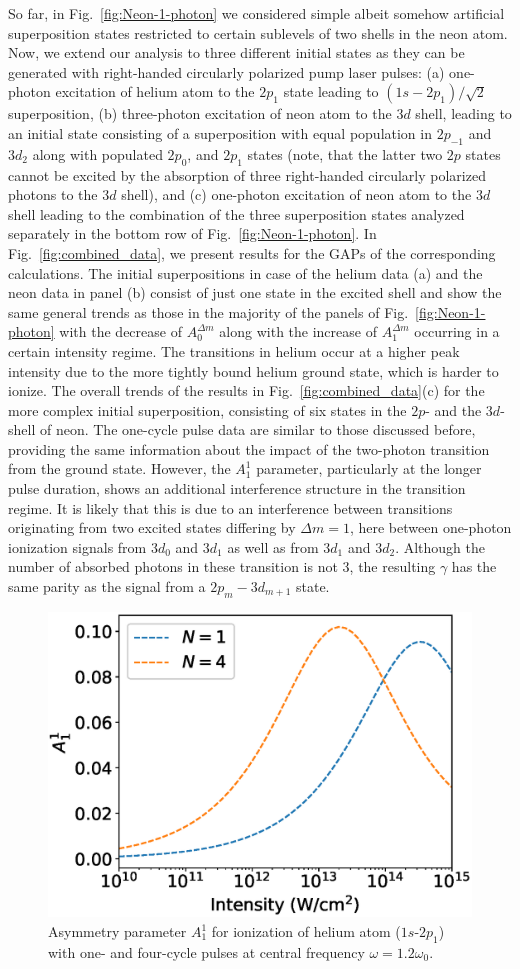 So far, in Fig.~\ref{fig:Neon-1-photon} we considered simple albeit somehow artificial superposition states restricted to certain sublevels of two shells in the neon atom. Now, we extend our analysis to three different initial states as they can be generated with right-handed circularly polarized pump laser pulses: (a) one-photon excitation of helium atom to the $2p_1$ state leading to $(1s-2p_1)/\sqrt{2}$ superposition, (b) three-photon excitation of neon atom to the $3d$  shell, leading to an initial state consisting of a superposition with equal population in $2p_{-1}$ and $3d_2$ along with populated $2p_0$, and $2p_1$ states (note, that the latter two $2p$ states cannot be excited by the absorption of three right-handed circularly polarized photons to the $3d$ shell), and (c) one-photon excitation of neon atom to the $3d$ shell leading to the combination of the three superposition states analyzed separately in the bottom row of Fig.~\ref{fig:Neon-1-photon}.
In Fig.~\ref{fig:combined_data}, we present results for the GAPs of the corresponding calculations.
The initial superpositions in case of the helium data (a) and the neon data in panel (b) consist of just one state in the excited shell and show the same general trends as those in the majority of the panels of  Fig.~\ref{fig:Neon-1-photon} with the decrease of $A_0^{\Delta m}$ along with the increase of $A_1^{\Delta m}$ occurring in a certain  intensity regime. The transitions in helium occur at a higher peak intensity due to the more tightly bound helium ground state, which is harder to ionize.  
The overall trends of the results in Fig.~\ref{fig:combined_data}(c) for the more complex initial superposition, consisting of six states in the $2p$- and the $3d$-shell of neon.
The one-cycle pulse data are similar to those discussed before, providing the same information about the impact of the two-photon transition from the ground state. However, the $A_1^1$ parameter, particularly at the longer pulse duration, shows an additional interference structure in the transition regime. It is likely that this is due
to an interference between transitions originating from two excited states differing by $\Delta m = 1$, here between one-photon ionization signals
from $3d_0$ and $3d_1$ as well as from $3d_1$ and $3d_2$. Although the number of absorbed photons in these transition is not 3, the resulting $\gamma$ has the same parity as the signal from a $2p_m-3d_{m+1}$ state.

\begin{figure}[t]
\centering
\includegraphics[width=.45\linewidth]{figs/Photo_ionization/GAP/He_2p1_detune_1p2.eps}
\caption{ 
Asymmetry parameter $A_1^1$ for ionization of helium atom ($1s$-$2p_1$) with one- and four-cycle pulses at central frequency 
$\omega=1.2\omega_0$.
} 
  \label{fig:detuned}
\end{figure}

